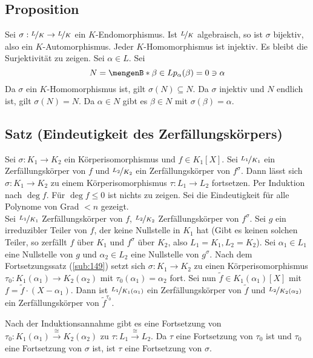 \subsection[Proposition: $K$-Endomorphismen algebraischer KE sind Automorphismen]{Proposition} %
\label{sub:1411}
Sei $\sigma : \nicefrac{L}{K} \to \nicefrac{L}{K}$ ein $K$-Endomorphismus. Ist $\nicefrac{L}{K}$ algebraisch, so ist $\sigma$ bijektiv, also ein 
$K$-Automorphismus.
Jeder $K$-Homomorphismus ist injektiv. Es bleibt die Surjektivität zu zeigen. Sei $\alpha \in L$. Sei 
\[
	N= \set[\beta \in L]{p_\alpha(\beta) =0} \ni \alpha 
\]
Da $\sigma$ ein $K$-Homomorphismus ist, gilt $\sigma(N) \subseteq N$. Da $\sigma$ injektiv und $N$ endlich ist, gilt $\sigma(N)=N$. Da $\alpha \in N$ gibt es $\beta\in N$
mit $\sigma(\beta)=\alpha$. \bewende

\subsection{Satz (Eindeutigkeit des Zerfällungskörpers)} %
\label{sub:1412}
Sei $\sigma : K_1 \to K_2$ ein Körperisomorphismus und $f \in K_1[X]$. Sei $\nicefrac{L_1}{K_1}$ ein Zerfällungskörper von $f$ und $\nicefrac{L_2}{K_2}$ ein Zerfällungskörper von $f^\sigma$. Dann lässt sich $\sigma : K_1 \to K_2$ zu einem Körperisomorphismus $\tau : L_1 \to L_2$ fortsetzen.
Per Induktion nach $\deg f$. Für $\deg f \le 0$ ist nichts zu zeigen. Sei die Eindeutigkeit für alle Polynome von Grad $<n$ gezeigt. \\
Sei $\nicefrac{L_1}{K_1}$ Zerfällungskörper von $f$, $\nicefrac{L_2}{K_2}$ Zerfällungskörper von $f^\sigma$. Sei $g$ ein irreduzibler Teiler von $f$, der keine Nullstelle in $K_1$ hat (Gibt es keinen solchen Teiler, so zerfällt $f$ über $K_1$ und $f^\sigma$ über $K_2$, also $L_1=K_1, L_2=K_2$). Sei $\alpha_1 \in L_1$ eine Nullstelle von $g$
und $\alpha_2 \in L_2$ eine Nullstelle von $g^\sigma$. Nach dem Fortsetzungssatz (\ref{sub:149}) setzt sich $\sigma :K_1 \to K_2$ zu einen Körperisomorphismus
$\tau_0 :K_1(\alpha_1) \to K_2(\alpha_2)$ mit $\tau_0(\alpha_1)=\alpha_2$ fort. Sei nun $\tilde f \in K_1(\alpha_1)[X]$ mit $f= \tilde f \cdot (X-\alpha_1)$. Dann ist
$\nicefrac{L_1}{K_1(\alpha_1)}$ ein Zerfällungskörper von $\tilde f$ und $\nicefrac{L_2}{K_2(\alpha_2)}$ ein Zerfällungskörper von $\tilde f^{\tau_0}$.

Nach der Induktionsannahme gibt es eine Fortsetzung von $\tau_0 : K_1(\alpha_1) \xrightarrow{\cong} K_2(\alpha_2)$ zu $\tau : L_1 \xrightarrow{\cong} L_2$. Da $\tau$
eine Fortsetzung von $\tau_0$ ist und $\tau_0$ eine Fortsetzung von $\sigma$ ist, ist $\tau$ eine Fortsetzung von $\sigma$. \bewende

